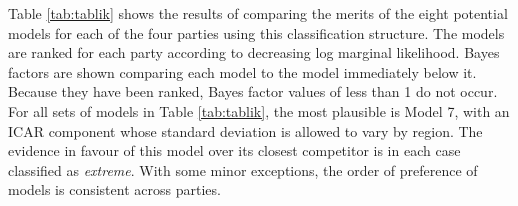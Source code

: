 \documentclass[webpdf,large,contemporary,namedate]{oup-authoring-template}
\theoremstyle{thmstyleone}
\theoremstyle{thmstyletwo}
\theoremstyle{thmstylethree}
\begin{document}
Table \ref{tab:tablik} shows the results of comparing the merits of the
eight potential models for each of the four parties using this
classification structure. The models are ranked for each party according
to decreasing log marginal likelihood. Bayes factors are shown comparing
each model to the model immediately below it. Because they have been
ranked, Bayes factor values of less than 1 do not occur. For all sets of
models in Table \ref{tab:tablik}, the most plausible is Model 7, with an
ICAR component whose standard deviation is allowed to vary by region.
The evidence in favour of this model over its closest competitor is in
each case classified as \textit{extreme}. With some minor exceptions,
the order of preference of models is consistent across parties.

\begin{table}


\end{table}
\end{document}
